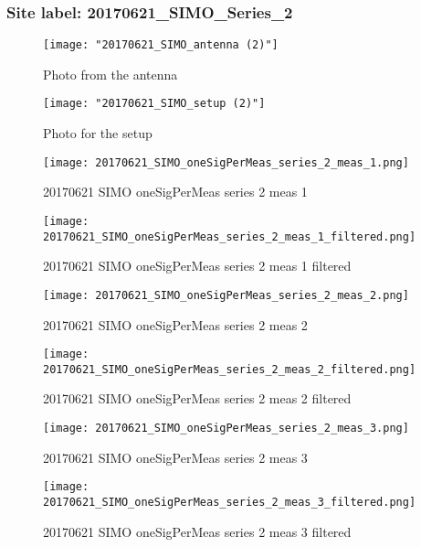 \subsubsection{Site label: 20170621\_SIMO\_Series\_2}
\begin{figure}[ht] \caption{Photo from the antenna}
\texttt{[image: "20170621\_SIMO\_antenna (2)"]}\centering\end{figure}
\begin{figure}[ht] \caption{Photo for the setup}
\texttt{[image: "20170621\_SIMO\_setup (2)"]}\centering\end{figure}
\begin{figure}[ht] \caption{20170621 SIMO oneSigPerMeas series 2 meas 1}
\texttt{[image: 20170621\_SIMO\_oneSigPerMeas\_series\_2\_meas\_1.png]}\centering\end{figure}
\begin{figure}[ht] \caption{20170621 SIMO oneSigPerMeas series 2 meas 1 filtered}
\texttt{[image: 20170621\_SIMO\_oneSigPerMeas\_series\_2\_meas\_1\_filtered.png]}\centering\end{figure}
\begin{figure}[ht] \caption{20170621 SIMO oneSigPerMeas series 2 meas 2}
\texttt{[image: 20170621\_SIMO\_oneSigPerMeas\_series\_2\_meas\_2.png]}\centering\end{figure}
\begin{figure}[ht] \caption{20170621 SIMO oneSigPerMeas series 2 meas 2 filtered}
\texttt{[image: 20170621\_SIMO\_oneSigPerMeas\_series\_2\_meas\_2\_filtered.png]}\centering\end{figure}
\begin{figure}[ht] \caption{20170621 SIMO oneSigPerMeas series 2 meas 3}
\texttt{[image: 20170621\_SIMO\_oneSigPerMeas\_series\_2\_meas\_3.png]}\centering\end{figure}
\begin{figure}[ht] \caption{20170621 SIMO oneSigPerMeas series 2 meas 3 filtered}
\texttt{[image: 20170621\_SIMO\_oneSigPerMeas\_series\_2\_meas\_3\_filtered.png]}\centering\end{figure}
\clearpage

